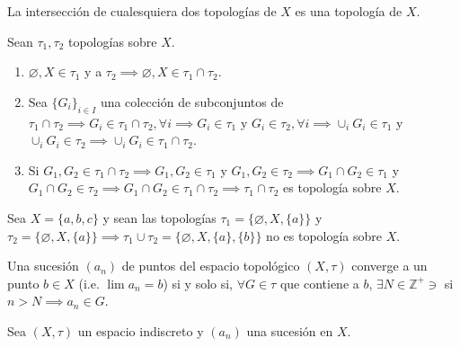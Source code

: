 \begin{prop}
    La intersección de cualesquiera dos topologías de $X$ es una topología de $X$. 
    \begin{dem}
        Sean $\tau_1,\tau_2$ topologías sobre $X$.
        \begin{enumerate}
            \item $\varnothing,X\in\tau_1$ y a $\tau_2\implies \varnothing,X\in \tau_1\cap \tau_2$.
            \item Sea $\{G_i\}_{i\in I}$ una colección de subconjuntos de $\tau_1\cap \tau_2\implies G_i\in \tau_1\cap \tau_2,\forall i\implies G_i\in \tau_1$ y $G_i\in \tau_2,\forall i\implies \cup_i G_i\in\tau_1$ y $\cup_iG_i\in\tau_2\implies \cup_iG_i \in \tau_1\cap \tau_2$. 
            \item Si $G_1,G_2\in \tau_1\cap \tau_2\implies G_1,G_2\in \tau_1$ y $G_1,G_2\in\tau_2\implies G_1\cap G_2\in\tau_1$ y $G_1\cap G_2\in \tau_2\implies G_1\cap G_2\in \tau_1\cap\tau_2\implies \tau_1\cap\tau_2$ es topología sobre $X$. 
        \end{enumerate}
    \end{dem}
\end{prop}

\begin{nota}
    Sea $X=\{a,b,c\}$ y sean las topologías $\tau_1=\{\varnothing, X,\{a\}\}$ y $\tau_2=\{\varnothing,X,\{a\}\}\implies \tau_1\cup\tau_2=\{\varnothing,X,\{a\},\{b\}\}$ no es topología sobre $X$. 
\end{nota}

\begin{definicion}
    Una sucesión $(a_n)$ de puntos del espacio topológico $(X,\tau)$ converge a un punto $b\in X$ (i.e. $\lim a_n=b$) si y solo si, $\forall G\in\tau$ que contiene a $b$, $\exists N\in\mathbb{Z}^+\ni$ si $n>N\implies a_n\in G$.  
\end{definicion}

\begin{ejemplo}
    Sea $(X,\tau)$ un espacio indiscreto y $(a_n)$ una sucesión en $X$. 
\end{ejemplo}